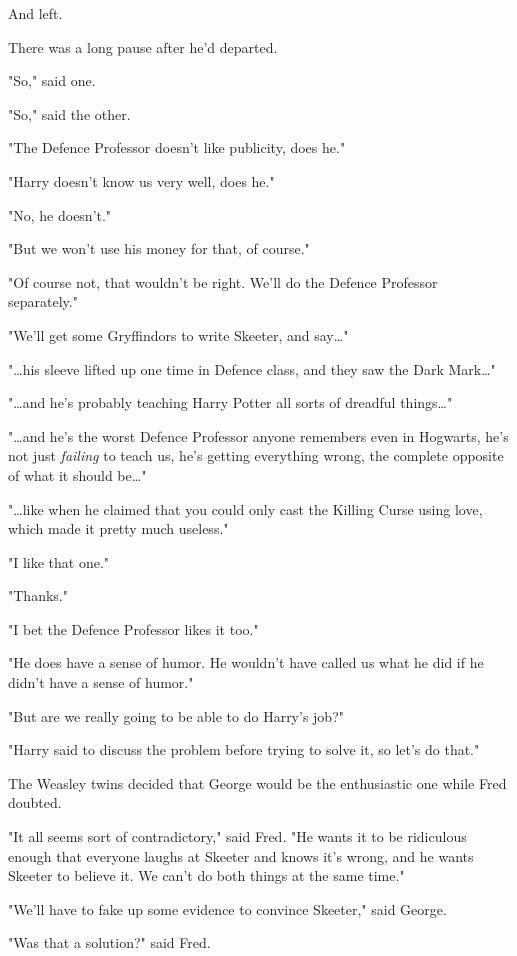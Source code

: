 And left.

There was a long pause after he'd departed.

"So," said one.

"So," said the other.

"The Defence Professor doesn't like publicity, does he."

"Harry doesn't know us very well, does he."

"No, he doesn't."

"But we won't use his money for that, of course."

"Of course not, that wouldn't be right. We'll do the Defence Professor
separately."

"We'll get some Gryffindors to write Skeeter, and say{\ldots}"

"{\ldots}his sleeve lifted up one time in Defence class, and they saw the Dark
Mark{\ldots}"

"{\ldots}and he's probably teaching Harry Potter all sorts of dreadful
things{\ldots}"

"{\ldots}and he's the worst Defence Professor anyone remembers even in
Hogwarts, he's not just \emph{failing} to teach us, he's getting everything
wrong, the complete opposite of what it should be{\ldots}"

"{\ldots}like when he claimed that you could only cast the Killing Curse using
love, which made it pretty much useless."

"I like that one."

"Thanks."

"I bet the Defence Professor likes it too."

"He does have a sense of humor. He wouldn't have called us what he did if he
didn't have a sense of humor."

"But are we really going to be able to do Harry's job?"

"Harry said to discuss the problem before trying to solve it, so let's do that."

The Weasley twins decided that George would be the enthusiastic one while Fred
doubted.

"It all seems sort of contradictory," said Fred. "He wants it to be ridiculous
enough that everyone laughs at Skeeter and knows it's wrong, and he wants
Skeeter to believe it. We can't do both things at the same time."

"We'll have to fake up some evidence to convince Skeeter," said George.

"Was that a solution?" said Fred.

